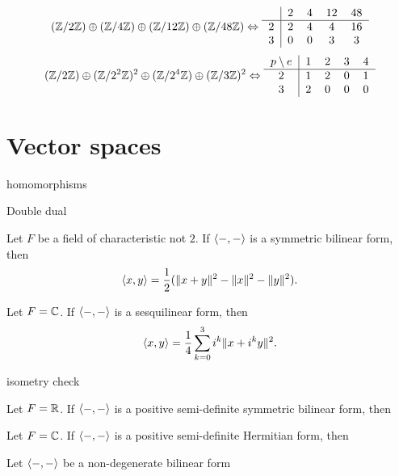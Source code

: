 \documentclass{../../large}
\begin{document}
\[
(\Z/2\Z)\oplus(\Z/4\Z)\oplus(\Z/12\Z)\oplus(\Z/48\Z)
\Leftrightarrow
\begin{tabular}{c|cccc}
& 2 & 4 & 12 & 48 \\\hline
2 & 2 & 4 & 4 & 16 \\
3 & 0 & 0 & 3 & 3
\end{tabular}
\]
\[
(\Z/2\Z)\oplus(\Z/2^2\Z)^2\oplus(\Z/2^4\Z)\oplus(\Z/3\Z)^2
\Leftrightarrow
\begin{tabular}{c|cccc}
$p\setminus e$ & 1 & 2 & 3 & 4 \\\hline
2 & 1 & 2 & 0 & 1 \\
3 & 2 & 0 & 0 & 0
\end{tabular}
\]




\section{Vector spaces}

\begin{prb}[Fields]
homomorphisms
\end{prb}

\begin{prb}
Double dual
\end{prb}



\begin{prb}
\begin{parts}
\item Let $F$ be a field of characteristic not $2$. If $\langle-,-\rangle$ is a symmetric bilinear form, then
\[\langle x,y\rangle=\frac12(\|x+y\|^2-\|x\|^2-\|y\|^2).\]
\item Let $F=\mathbb{C}$. If $\langle-,-\rangle$ is a sesquilinear form, then
\[\langle x,y\rangle=\frac14\sum_{k=0}^3i^k\|x+i^ky\|^2.\]
\item isometry check
\end{parts}
\end{prb}

\begin{prb}
\begin{parts}
\item Let $F=\mathbb{R}$. If $\langle-,-\rangle$ is a positive semi-definite symmetric bilinear form, then
\item Let $F=\mathbb{C}$. If $\langle-,-\rangle$ is a positive semi-definite Hermitian form, then
\end{parts}
\end{prb}

\begin{prb}
Let $\langle-,-\rangle$ be a non-degenerate bilinear form
\end{prb}
\end{document}
